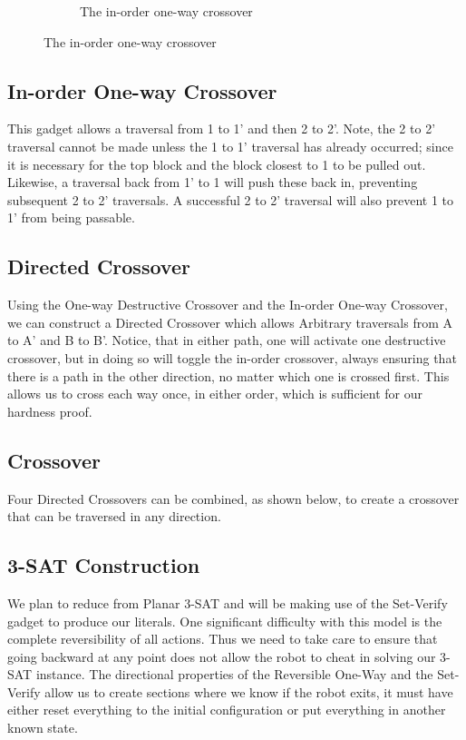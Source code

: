 \documentclass[11pt]{article}
\begin{document}
\begin{figure}[!ht]
\begin{subfigure}[b]{0.35\textwidth}
    \caption{The in-order one-way crossover}
    \label{ldeDiagrams}
  \end{subfigure}
\end{figure}

\subsection{In-order One-way Crossover}
This gadget allows a traversal from 1 to 1' and then 2 to 2'. Note, the 2 to 2' traversal cannot be made unless the 1 to 1' traversal has already occurred; since it is necessary for the top block and the block closest to 1 to be pulled out. Likewise, a traversal back from 1' to 1 will push these back in, preventing subsequent 2 to 2' traversals. A successful 2 to 2' traversal will also prevent 1 to 1' from being passable.

\subsection{Directed Crossover}
Using the One-way Destructive Crossover and the In-order One-way Crossover, we can construct a Directed Crossover which allows Arbitrary traversals from A to A' and B to B'. Notice, that in either path, one will activate one destructive crossover, but in doing so will toggle the in-order crossover, always ensuring that there is a path in the other direction, no matter which one is crossed first. This allows us to cross each way once, in either order, which is sufficient for our hardness proof.

\subsection{Crossover}
Four Directed Crossovers can be combined, as shown below, to create a crossover that can be traversed in any direction.

\subsection{3-SAT Construction}
We plan to reduce from Planar 3-SAT and will be making use of the Set-Verify gadget to produce our literals. One significant difficulty with this model is the complete reversibility of all actions. Thus we need to take care to ensure that going backward at any point does not allow the robot to cheat in solving our 3-SAT instance. The directional properties of the Reversible One-Way and the Set-Verify allow us to create sections where we know if the robot exits, it must have either reset everything to the initial configuration or put everything in another known state.
\end{document}
